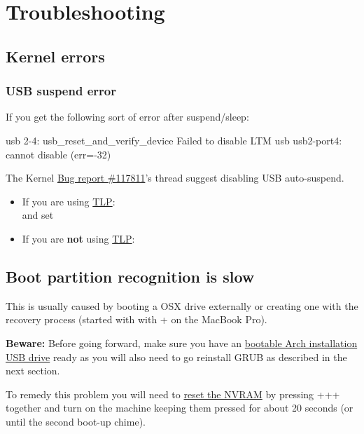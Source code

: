 \clearpage
\section{Troubleshooting}

\subsection{Kernel errors}
\subsubsection{USB suspend error}

If you get the following sort of error after suspend/sleep:
\vspace*{0.6em}
\begin{codeblock}
	usb 2-4: usb\_reset\_and\_verify\_device Failed to disable LTM\linebreak	
	usb usb2-port4: cannot disable (err=-32)
\end{codeblock}

The Kernel \href{https://bugzilla.kernel.org/show_bug.cgi?id=117811}{Bug report \#117811}'s thread suggest disabling USB auto-suspend.

\begin{itemize}[noitemsep,topsep=0pt,leftmargin=*]
	\item If you are using \href{https://wiki.archlinux.org/index.php/TLP}{TLP}:\\
	 and set 
	\item If you are \textbf{not} using \href{https://wiki.archlinux.org/index.php/TLP}{TLP}:\\
\end{itemize}

\subsection{Boot partition recognition is slow}

This is usually caused by booting a OSX drive externally or creating one with the recovery process (started with with + on the MacBook Pro). 

\textbf{Beware:} Before going forward, make sure you have an \underline{bootable Arch installation USB drive} ready as you will also need to go reinstall GRUB as described in the next section.

To remedy this problem you will need to \href{https://support.apple.com/en-us/HT204063}{reset the NVRAM} by pressing +++ together and turn on the machine keeping them pressed for about 20 seconds (or until the second boot-up chime).

